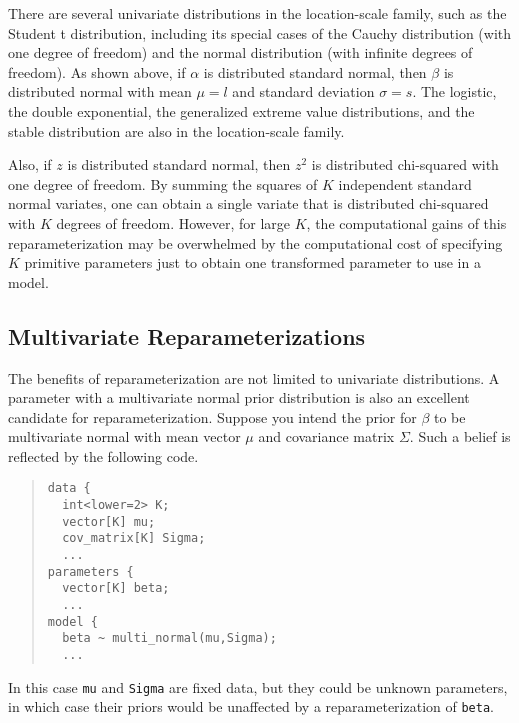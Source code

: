 There are several univariate distributions in the location-scale
family, such as the Student t distribution, including its special
cases of the Cauchy distribution (with one degree of freedom) and the
normal distribution (with infinite degrees of freedom). As shown above,
if $\alpha$ is distributed standard normal, then $\beta$ is distributed
normal with mean $\mu = l$ and standard deviation $\sigma = s$. The 
logistic, the double exponential, the generalized extreme value 
distributions, and the stable distribution are also in the 
location-scale family.

Also, if $z$ is distributed standard normal, then $z^2$ is distributed
chi-squared with one degree of freedom. By summing the squares of $K$
independent standard normal variates, one can obtain a single variate
that is distributed chi-squared with $K$ degrees of freedom. However,
for large $K$, the computational gains of this reparameterization may
be overwhelmed by the computational cost of specifying $K$ primitive
parameters just to obtain one transformed parameter to use in a model.

\subsection{Multivariate Reparameterizations}

The benefits of reparameterization are not limited to univariate 
distributions. A parameter with a multivariate normal prior distribution
is also an excellent candidate for reparameterization. Suppose you intend
the prior for $\beta$ to be multivariate normal with mean vector $\mu$
and covariance matrix $\Sigma$. Such a belief is reflected by the
following code.
%
\begin{quote}
\begin{Verbatim}[fontsize=\small]
data {
  int<lower=2> K;
  vector[K] mu;
  cov_matrix[K] Sigma;
  ...
parameters {
  vector[K] beta;
  ...
model {
  beta ~ multi_normal(mu,Sigma);
  ...
\end{Verbatim}
\end{quote}
%
In this case \Verb|mu| and \Verb|Sigma| are fixed data, but they could
be unknown parameters, in which case their priors would be unaffected
by a reparameterization of \Verb|beta|.

